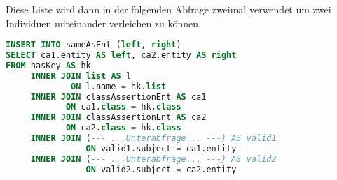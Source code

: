 Diese Liste wird dann in der folgenden Abfrage zweimal verwendet um zwei Individuen miteinander verleichen zu können.
\begin{lstlisting}[language=SQL]
INSERT INTO sameAsEnt (left, right)
SELECT ca1.entity AS left, ca2.entity AS right
FROM hasKey AS hk
     INNER JOIN list AS l
             ON l.name = hk.list
     INNER JOIN classAssertionEnt AS ca1
            ON ca1.class = hk.class
     INNER JOIN classAssertionEnt AS ca2
            ON ca2.class = hk.class
     INNER JOIN (--- ...Unterabfrage... ---) AS valid1
                ON valid1.subject = ca1.entity
     INNER JOIN (--- ...Unterabfrage... ---) AS valid2
                ON valid2.subject = ca2.entity
\end{lstlisting}